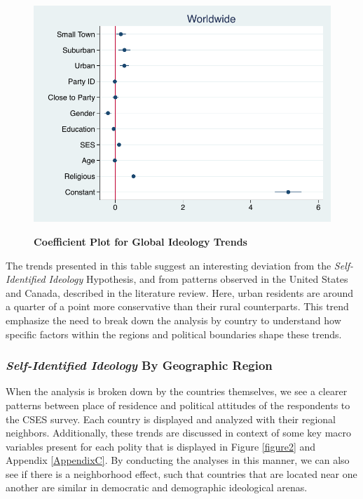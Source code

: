 \documentclass[12pt, titlepage]{article}
\newcommand\e{\emph}
\newcommand\tb{\textbf}
\begin{document}
\begin{figure}[H]    \centering
	{	 \includegraphics[width=.6\textwidth]{CoefAllIdeo}}
	\caption{\tb{Coefficient Plot for Global Ideology Trends}}\label{WorldIdeoCoef}
\end{figure}

The trends presented in this table suggest an interesting deviation from the \e{Self-Identified Ideology} Hypothesis, and from patterns observed in the United States and Canada, described in the literature review. Here, urban residents are around a quarter of a point more conservative than their rural counterparts. This trend emphasize the need to break down the analysis by country to understand how specific factors within the regions and political boundaries shape these trends.

\subsubsection{\e{Self-Identified Ideology} By Geographic Region}

When the analysis is broken down by the countries themselves, we see a clearer patterns between place of residence and political attitudes of the respondents to the CSES survey. Each country is displayed and analyzed with their regional neighbors. Additionally, these trends are discussed in context of some key macro variables present for each polity that is displayed in Figure \ref{figure2} and Appendix \ref{AppendixC}. By conducting the analyses in this manner, we can also see if there is a neighborhood effect, such that countries that are located near one another are similar in democratic and demographic ideological arenas.
\end{document}
